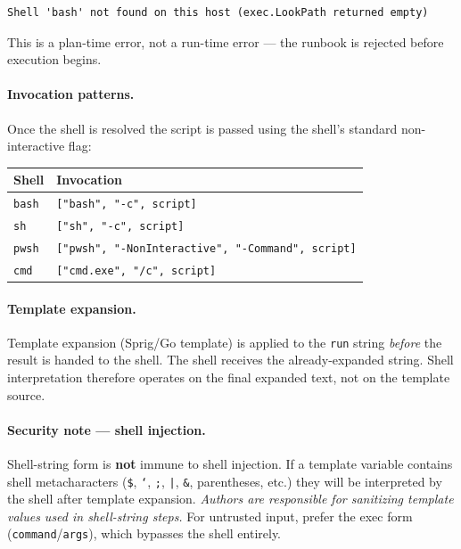 \begin{verbatim}
Shell 'bash' not found on this host (exec.LookPath returned empty)
\end{verbatim}

This is a plan-time error, not a run-time error — the runbook is rejected before
execution begins.

\paragraph{Invocation patterns.}
Once the shell is resolved the script is passed using the shell's standard
non-interactive flag:

\begin{center}
\begin{tabular}{|l|l|}
\hline
\textbf{Shell} & \textbf{Invocation} \\
\hline
\texttt{bash} & \texttt{["bash", "-c", script]} \\
\texttt{sh}   & \texttt{["sh", "-c", script]} \\
\texttt{pwsh} & \texttt{["pwsh", "-NonInteractive", "-Command", script]} \\
\texttt{cmd}  & \texttt{["cmd.exe", "/c", script]} \\
\hline
\end{tabular}
\end{center}

\paragraph{Template expansion.}
Template expansion (Sprig/Go template) is applied to the \texttt{run} string
\emph{before} the result is handed to the shell.  The shell receives the
already-expanded string.  Shell interpretation therefore operates on the final
expanded text, not on the template source.

\paragraph{Security note — shell injection.}
Shell-string form is \textbf{not} immune to shell injection.  If a template variable
contains shell metacharacters (\texttt{\$}, \texttt{`}, \texttt{;}, \texttt{|},
\texttt{\&}, parentheses, etc.) they will be interpreted by the shell after template
expansion.  \emph{Authors are responsible for sanitizing template values used in
shell-string steps.}  For untrusted input, prefer the exec form
(\texttt{command}/\texttt{args}), which bypasses the shell entirely.

